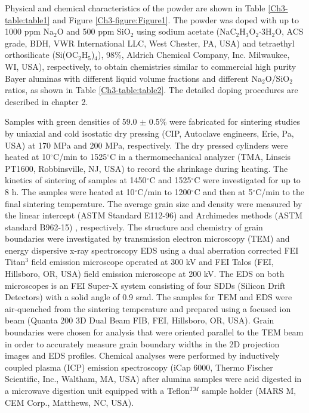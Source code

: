 Physical and chemical characteristics of the powder are shown in Table \ref{Ch3-table:table1} and Figure \ref{Ch3-figure:Figure1}. The powder was doped with up to 1000 ppm Na$_{2}$O and 500 ppm SiO$_{2}$ using sodium acetate (NaC$_{2}$H$_{3}$O$_{2}$$\cdot$3H$_{2}$O, ACS grade, BDH, VWR International LLC, West Chester, PA, USA) and tetraethyl orthosilicate (Si(OC$_{2}$H$_{5}$)$_{4}$), 98\%, Aldrich Chemical Company, Inc. Milwaukee, WI, USA), respectively, to obtain chemistries similar to commercial high purity Bayer aluminas with different liquid volume fractions and different Na$_{2}$O/SiO$_{2}$ ratios, as shown in Table \ref{Ch3-table:table2}. The detailed doping procedures are described in chapter 2. 

Samples with green densities of 59.0 $\pm$ 0.5\% were fabricated for sintering studies by uniaxial and cold isostatic dry pressing (CIP, Autoclave engineers, Erie, Pa, USA) at 170 MPa and 200 MPa, respectively. The dry pressed cylinders were heated at 10$^{\circ}$C/min to 1525$^{\circ}$C in a thermomechanical analyzer (TMA, Linseis PT1600, Robbinsville, NJ, USA) to record the shrinkage during heating. The kinetics of sintering of samples at 1450$^{\circ}$C and 1525$^{\circ}$C were investigated for up to 8 h. The samples were heated at 10$^{\circ}$C/min to 1200$^{\circ}$C and then at 5$^{\circ}$C/min to the final sintering temperature. The average grain size and density were measured by the linear intercept (ASTM Standard E112-96) \cite{Standard2013} and Archimedes methods (ASTM standard B962-15) \cite{Standard2015}, respectively. The structure and chemistry of grain boundaries were investigated by transmission electron microscopy (TEM) and energy dispersive x-ray spectroscopy EDS using a dual aberration corrected FEI Titan$^{3}$ field emission microscope operated at 300 kV and FEI Talos (FEI, Hillsboro, OR, USA) field emission microscope at 200 kV. The EDS on both microscopes is an FEI Super-X system consisting of four SDDs (Silicon Drift Detectors) with a solid angle of 0.9 srad. The samples for TEM and EDS were air-quenched from the sintering temperature and prepared using a focused ion beam (Quanta 200 3D Dual Beam FIB, FEI, Hillsboro, OR, USA). Grain boundaries were chosen for analysis that were oriented parallel to the TEM beam in order to accurately measure grain boundary widths in the 2D projection images and EDS profiles. Chemical analyses were performed by inductively coupled plasma (ICP) emission spectroscopy (iCap 6000, Thermo Fischer Scientific, Inc., Waltham, MA, USA) after alumina samples were acid digested in a microwave digestion unit equipped with a Teflon$^{TM}$ sample holder (MARS M, CEM Corp., Matthews, NC, USA).

